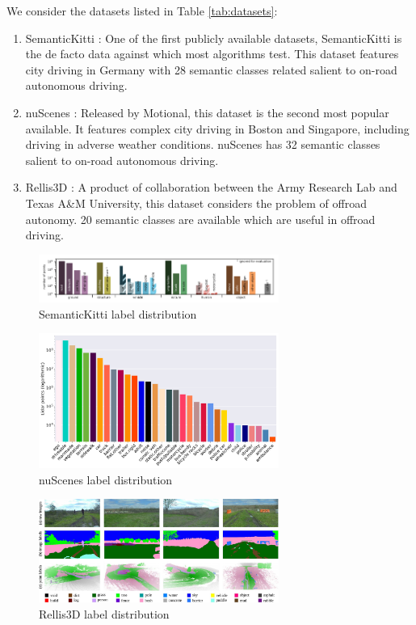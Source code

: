 We consider the datasets listed in Table \ref{tab:datasets}:
\begin{enumerate}
  \item SemanticKitti \cite{semantickitti1,semantickitti2}: One of the first publicly available datasets, SemanticKitti is the de facto data against which most algorithms test. This dataset features city driving in Germany with 28 semantic classes related salient to on-road autonomous driving.
  \item nuScenes \cite{nuscenes}: Released by Motional, this dataset is the second most popular available. It features complex city driving in Boston and Singapore, including driving in adverse weather conditions. nuScenes has 32 semantic classes salient to on-road autonomous driving.
  \item Rellis3D \cite{rellis3d}: A product of collaboration between the Army Research Lab and Texas A\&M University, this dataset considers the problem of offroad autonomy. 20 semantic classes are available which are useful in offroad driving.
\end{enumerate}

\begin{figure}[htp]
  \centering
  \includegraphics[width=0.7\textwidth]{images/semantic_kitti_label_distribution.png}
  \caption{SemanticKitti label distribution}
  \label{fig:semantickitti-label-distribution}
\end{figure}

\begin{figure}[htp]
  \centering
  \includegraphics[width=0.7\textwidth]{images/nuscenes_label_set.png}
  \caption{nuScenes label distribution}
  \label{fig:nuscenes-label-set}
\end{figure}

\begin{figure}[htp]
  \centering
  \includegraphics[width=0.7\textwidth]{images/rellis_label_suite.png}
  \caption{Rellis3D label distribution}
  \label{fig:rellis-labe-suite}
\end{figure}

